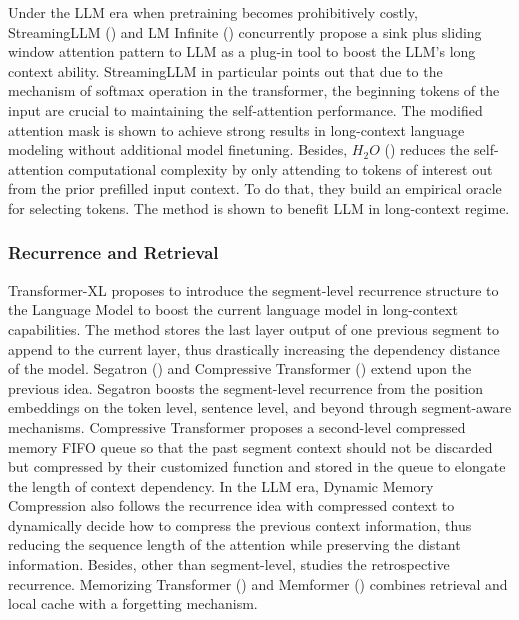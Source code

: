Under the LLM era when pretraining becomes prohibitively costly, StreamingLLM (\cite{xiao2023efficient}) and LM Infinite (\cite{han2023lm}) concurrently propose a sink plus sliding window attention pattern to LLM as a plug-in tool to boost the LLM's long context ability. StreamingLLM in particular points out that due to the mechanism of softmax operation in the transformer, the beginning tokens of the input are crucial to maintaining the self-attention performance. The modified attention mask is shown to achieve strong results in long-context language modeling without additional model finetuning. Besides, $H_{2}O$ (\cite{zhang2024h2o}) reduces the self-attention computational complexity by only attending to tokens of interest out from the prior prefilled input context. To do that, they build an empirical oracle for selecting tokens. The method is shown to benefit LLM in long-context regime. 

\subsubsection{Recurrence and Retrieval} 
Transformer-XL \cite{dai2019transformer} proposes to introduce the segment-level recurrence structure to the Language Model to boost the current language model in long-context capabilities. The method stores the last layer output of one previous segment to append to the current layer, thus drastically increasing the dependency distance of the model. Segatron (\cite{bai2021segatron}) and Compressive Transformer (\cite{rae2019compressive}) extend upon the previous idea. Segatron boosts the segment-level recurrence from the position embeddings on the token level, sentence level, and beyond through segment-aware mechanisms. Compressive Transformer proposes a second-level compressed memory FIFO queue so that the past segment context should not be discarded but compressed by their customized function and stored in the queue to elongate the length of context dependency. 
In the LLM era, Dynamic Memory Compression \cite{nawrot2024dynamic} also follows the recurrence idea with compressed context to dynamically decide how to compress the previous context information, thus reducing the sequence length of the attention while preserving the distant information. Besides, other than segment-level, \cite{fan2020addressing} studies the retrospective recurrence. Memorizing Transformer (\cite{wu2022memorizing}) and Memformer (\cite{wu2020memformer}) combines retrieval and local cache with a forgetting mechanism.  \\ 

